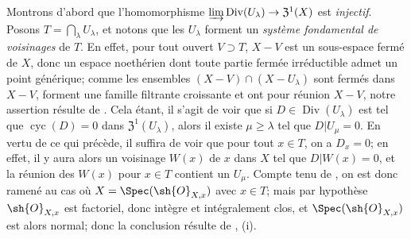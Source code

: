 Montrons d'abord que l'homomorphisme $\varinjlim\operatorname{Div}(U_\lambda)\to\mathfrak{Z}^1(X)$ est \emph{injectif}.
Posons $T=\bigcap_\lambda U_\lambda$, et notons que les $U_\lambda$ forment un \emph{système fondamental de voisinages} de $T$.
En effet, pour tout ouvert $V\supset T$, $X-V$ est un sous-espace fermé de $X$, donc un espace noethérien dont toute partie fermée irréductible admet un point générique;
comme les ensembles $(X-V)\cap(X-U_\lambda)$ sont fermés dans $X-V$, forment une famille filtrante croissante et ont pour réunion $X-V$, notre assertion résulte de .
Cela étant, il s'agit de voir que si $D\in\operatorname{Div}(U_\lambda)$ est tel que $\operatorname{cyc}(D)=0$ dans $\mathfrak{Z}^1(U_\lambda)$, alors il existe $\mu\geq\lambda$ tel que $D|U_\mu=0$.
En vertu de ce qui précède, il suffira de voir que pour tout $x\in T$, on a $D_x=0$;
en effet, il y aura alors un voisinage $W(x)$ de $x$ dans $X$ tel que $D|W(x)=0$, et la réunion des $W(x)$ pour $x\in T$ contient un $U_\mu$.
Compte tenu de , on est donc ramené au cas où $X=\Spec(\sh{O}_{X,x})$ avec $x\in T$;
mais par hypothèse $\sh{O}_{X,x}$ est factoriel, donc intègre et intégralement clos, et $\Spec(\sh{O}_{X,x})$ est alors normal;
donc la conclusion résulte de , (i).

